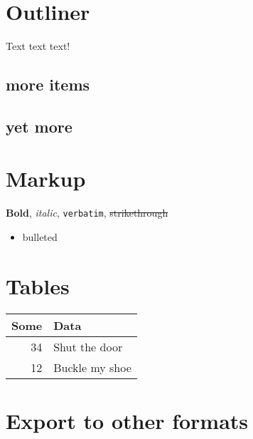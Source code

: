 \documentclass[11pt]{article}
\author{Kevin Hong}
\date{\today}
\title{}
\begin{document}
\tableofcontents

\section{Outliner}
\label{sec:orgheadline3}
Text text text!
\subsection{more items}
\label{sec:orgheadline1}
\subsection{yet more}
\label{sec:orgheadline2}

\section{Markup}
\label{sec:orgheadline4}
\textbf{Bold}, \emph{italic}, \texttt{verbatim}, \sout{strikethrough}
\begin{itemize}
\item bulleted
\end{itemize}

\section{Tables}
\label{sec:orgheadline5}

\begin{center}
\begin{tabular}{rl}
Some & Data\\
\hline
34 & Shut the door\\
12 & Buckle my shoe\\
\end{tabular}
\end{center}

\section{Export to other formats}
\label{sec:orgheadline6}
\end{document}
